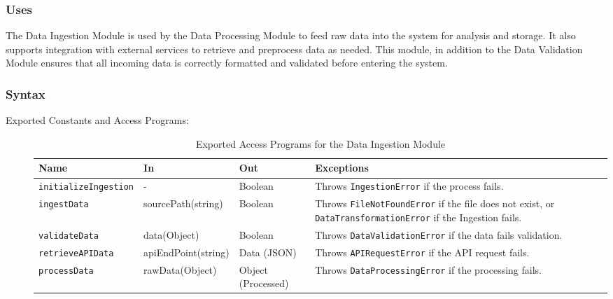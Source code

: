 \documentclass[12pt, titlepage]{article}
\begin{document}
\begin{description}
\begin{description}
\subsubsection{Uses}
The Data Ingestion Module is used by the Data Processing Module to feed raw data into the system
for analysis and storage. It also supports integration with external services to retrieve and
preprocess data as needed. This module, in addition to the Data Validation Module ensures that all
incoming data is correctly formatted and validated before entering the system.

\subsubsection{Syntax}
\begin{description}
  \item[Exported Constants and Access Programs:] 
  \begin{table}[h!]
    \centering
    \begin{tabular}{p{} p{} p{} p{}}
    \toprule
    \textbf{Name} & \textbf{In} & \textbf{Out} & \textbf{Exceptions}\\
    \midrule
    
    \texttt{initializeIngestion} & - & Boolean & Throws \texttt{IngestionError}
    if the process fails.\\
    \midrule
    
    \texttt{ingestData} & sourcePath(string) & Boolean & Throws \texttt{FileNotFoundError}
    if the file does not exist, or \texttt{DataTransformationError} if the Ingestion fails.\\
    \midrule

    \texttt{validateData} & data(Object) & Boolean & Throws \texttt{DataValidationError}
    if the data fails validation.\\
    \midrule

    \texttt{retrieveAPIData} & apiEndPoint(string) & Data (JSON) & Throws \texttt{APIRequestError}
    if the API request fails.\\
    \midrule

    \texttt{processData} & rawData(Object) & Object (Processed) & Throws \texttt{DataProcessingError}
    if the processing fails.\\
    \bottomrule
    
    \end{tabular}
    \caption{Exported Access Programs for the Data Ingestion Module}
    \label{TblEAP_Ingestion}
  \end{table}
\end{description}


\end{description}
\end{description}
\end{document}
